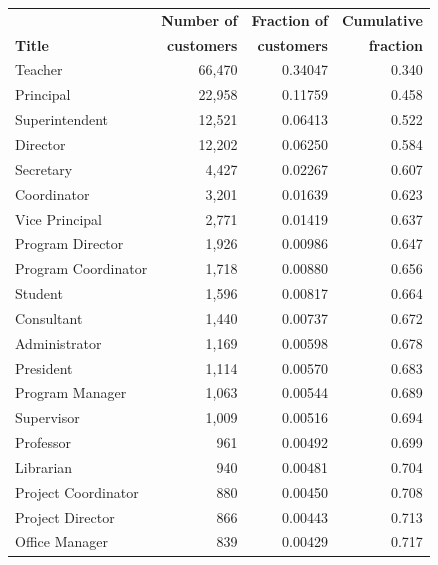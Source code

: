\begin{table}
\newlength{\unicola}
\newlength{\unicolb}
\newlength{\unicolc}
\settowidth{\unicola}{Number ofX}
\settowidth{\unicolb}{Fraction ofX}
\settowidth{\unicolc}{Cumulative}
\label{tbl:jobtitles}
\begin{tabular}{lrrr}
\toprule
   & \textbf{Number of}
   & \textbf{Fraction of}
  & \textbf{Cumulative} \\
\textbf{Title} &  \textbf{customers} & \textbf{customers} & \textbf{fraction}\\
\colrule
Teacher \rule{0mm}{4mm}  & 66,470  &  0.34047   &   0.340 \\ 
Principal                & 22,958  &  0.11759   &   0.458 \\
Superintendent           & 12,521  &  0.06413   &   0.522 \\
Director                 & 12,202  &  0.06250   &   0.584 \\
Secretary                &  4,427  &  0.02267   &   0.607 \\
Coordinator              &  3,201  &  0.01639   &   0.623 \\
Vice Principal           &  2,771  &  0.01419   &   0.637 \\
Program Director         &  1,926  &  0.00986   &   0.647 \\
Program Coordinator      &  1,718  &  0.00880   &   0.656 \\
Student                  &  1,596  &  0.00817   &   0.664 \\
Consultant               &  1,440  &  0.00737   &   0.672 \\
Administrator            &  1,169  &  0.00598   &   0.678 \\
President                &  1,114  &  0.00570   &   0.683 \\
Program Manager          &  1,063  &  0.00544   &   0.689 \\
Supervisor               &  1,009  &  0.00516   &   0.694 \\
Professor                &    961  &  0.00492   &   0.699 \\
Librarian                &    940  &  0.00481   &   0.704 \\
Project Coordinator      &    880  &  0.00450   &   0.708 \\
Project Director         &    866  &  0.00443   &   0.713 \\
Office Manager           &    839  &  0.00429   &   0.717 \\

\end{tabular}
\end{table}
